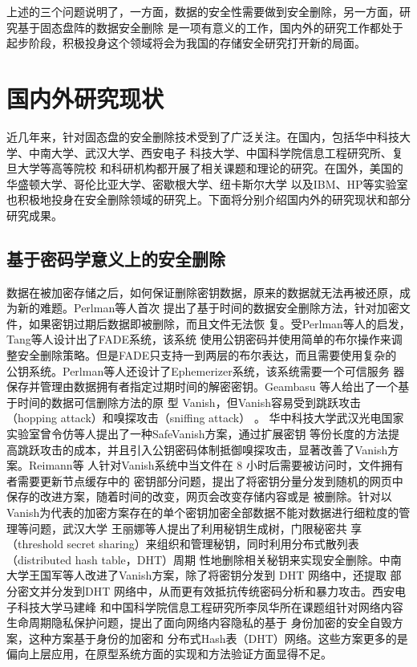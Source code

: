 上述的三个问题说明了，一方面，数据的安全性需要做到安全删除，另一方面，研究基于固态盘阵的数据安全删除
是一项有意义的工作，国内外的研究工作都处于起步阶段，积极投身这个领域将会为我国的存储安全研究打开新的局面。

\section{国内外研究现状}
近几年来，针对固态盘的安全删除技术受到了广泛关注。在国内，包括华中科技大学、中南大学、武汉大学、西安电子
科技大学、中国科学院信息工程研究所、复旦大学等高等院校
和科研机构都开展了相关课题和理论的研究。在国外，美国的华盛顿大学、哥伦比亚大学、密歇根大学、纽卡斯尔大学
以及IBM、HP等实验室也积极地投身在安全删除领域的研究上。下面将分别介绍国内外的研究现状和部分研究成果。
\subsection{基于密码学意义上的安全删除}
数据在被加密存储之后，如何保证删除密钥数据，原来的数据就无法再被还原，成为新的难题。Perlman等人首次
提出了基于时间的数据安全删除方法，针对加密文件，如果密钥过期后数据即被删除，而且文件无法恢
复\cite{Perlman2005File}。受Perlman等人的启发，Tang等人设计出了FADE系统\cite{Tang2012Secure}，该系统
使用公钥密码并使用简单的布尔操作来调整安全删除策略。但是FADE只支持一到两层的布尔表达，而且需要使用复杂的
公钥系统。Perlman等人还设计了Ephemerizer系统\cite{Perlman2005The,Tang2009Timed}，该系统需要一个可信服务
器保存并管理由数据拥有者指定过期时间的解密密钥。Geambasu 等人给出了一个基于时间的数据可信删除方法的原
型 Vanish\cite{Geambasu2009Vanish}，但Vanish容易受到跳跃攻击（hopping attack）和嗅探攻击（sniffing attack）\cite{Wolchok2010Defeating} 。
华中科技大学武汉光电国家实验室曾令仿等人提出了一种SafeVanish\cite{Zeng2010SafeVanish}方案，通过扩展密钥
等份长度的方法提高跳跃攻击的成本，并且引入公钥密码体制抵御嗅探攻击，显著改善了Vanish方案。Reimann等
人\cite{Reimann2012Timed}针对Vanish系统中当文件在 8 小时后需要被访问时，文件拥有者需要更新节点缓存中的
密钥部分问题，提出了将密钥分量分发到随机的网页中保存的改进方案，随着时间的改变，网页会改变存储内容或是
被删除。针对以Vanish为代表的加密方案存在的单个密钥加密全部数据不能对数据进行细粒度的管理等问题，武汉大学
王丽娜等人\cite{王丽娜2012一种适于云存储的数据确定性删除方法}提出了利用秘钥生成树，门限秘密共
享（threshold secret sharing）来组织和管理秘钥，同时利用分布式散列表（distributed hash table，DHT）周期
性地删除相关秘钥来实现安全删除。中南大学王国军等人改进了Vanish方案，除了将密钥分发到 DHT 网络中，还提取
部分密文并分发到DHT 网络中，从而更有效抵抗传统密码分析和暴力攻击\cite{Wang2010A}。西安电子科技大学马建峰
和中国科学院信息工程研究所李凤华所在课题组针对网络内容生命周期隐私保护问题，提出了面向网络内容隐私的基于
身份加密的安全自毁方案\cite{熊金波2014云计算环境中的组合文档模型及其访问控制方案,熊金波2014基于属性加密
的组合文档安全自毁方案,熊金波2014面向网络内容隐私的基于身份加密的安全自毁方案}，这种方案基于身份的加密和
分布式Hash表（DHT）网络。这些方案更多的是偏向上层应用，在原型系统方面的实现和方法验证方面显得不足。

